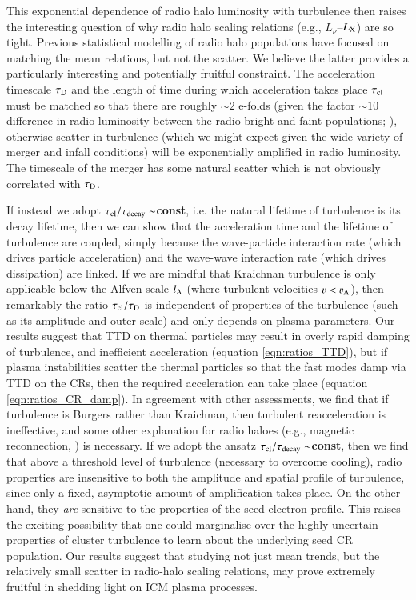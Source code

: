 \documentclass[fleqn,usenatbib,useAMS]{mnras}
\newcommand\C[1]{{\bf #1}}
\begin{document}
This exponential dependence of radio halo luminosity with turbulence then raises
the interesting question of why radio halo scaling relations (e.g.,
$L_{\nu}$--$L_{\rm X}$) are so tight. Previous statistical modelling of radio
halo populations \citep{2006MNRAS.369.1577C,2007MNRAS.378.1565C} have focused
on matching the mean relations, but not the scatter. We believe the latter
provides a particularly interesting and potentially fruitful constraint. The
acceleration timescale $\tau_{\rm D}$ and the length of time during which
acceleration takes place $\tau_{\rm cl}$ must be matched so that there are
roughly $\sim 2$ e-folds (given the factor $\sim 10$ difference in radio
luminosity between the radio bright and faint populations; \citet{brown11}),
otherwise scatter in turbulence (which we might expect given the wide variety of
merger and infall conditions) will be exponentially amplified in radio
luminosity. The timescale of the merger has some natural scatter which is not
obviously correlated with $\tau_{\rm D}$. 

If instead we adopt \C{$\tau_{\rm cl}/\tau_{\rm decay} \sim$const}, i.e. the natural
lifetime of turbulence is its decay lifetime, then we can show that the
acceleration time and the lifetime of turbulence are coupled, simply because the
wave-particle interaction rate (which drives particle acceleration) and the
wave-wave interaction rate (which drives dissipation) are linked. If we are
mindful that Kraichnan turbulence is only applicable below the Alfven scale
$l_{\rm A}$ (where turbulent velocities $\varv < \varv_{\rm A}$), then remarkably the
ratio $\tau_{\rm cl}/\tau_{\rm D}$ is independent of properties of the
turbulence (such as its amplitude and outer scale) and only depends on plasma
parameters. Our results suggest that TTD on thermal particles may result in
overly rapid damping of turbulence, and inefficient acceleration (equation
\ref{eqn:ratios_TTD}), but if plasma instabilities scatter the thermal particles
so that the fast modes damp via TTD on the CRs, then the required
acceleration can take place (equation \ref{eqn:ratios_CR_damp}). In agreement
with other assessments, we find that if turbulence is Burgers rather than
Kraichnan, then turbulent reacceleration is ineffective, and some other
explanation for radio haloes (e.g., magnetic reconnection, \citealt{brunetti16}) is
necessary. If we adopt the ansatz \C{$\tau_{\rm cl}/\tau_{\rm decay} \sim$const}, then we
find that above a threshold level of turbulence (necessary to overcome cooling),
radio properties are insensitive to both the amplitude and spatial profile of
turbulence, since only a fixed, asymptotic amount of amplification takes
place. On the other hand, they {\it are} sensitive to the properties of the seed
electron profile. This raises the exciting possibility that one could
marginalise over the highly uncertain properties of cluster turbulence to learn
about the underlying seed CR population. Our results suggest that studying not
just mean trends, but the relatively small scatter in radio-halo scaling
relations, may prove extremely fruitful in shedding light on ICM plasma
processes.
\end{document}
